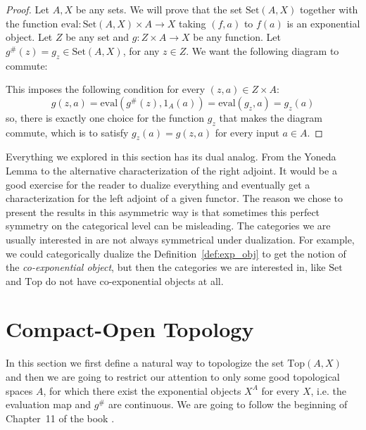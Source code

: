 \begin{proof} Let $A,X$ be any sets. We will prove that the set $\mathrm{Set}(A,X)$ together with the function $\mathrm{eval}:\mathrm{Set}(A,X)\times A\to X$ taking $(f,a)$ to $f(a)$ is an exponential object. Let $Z$ be any set and $g:Z\times A\to X$ be any function. Let $g^{\#}(z)=g_z\in\mathrm{Set}(A,X)$, for any $z\in Z$. We want the following diagram to commute:
\begin{center}
\end{center}
This imposes the following condition for every $(z,a)\in Z\times A$:
\[g(z,a)=\mathrm{eval}(g^{\#}(z),1_A(a))=\mathrm{eval}(g_z,a)=g_z(a)\]
so, there is exactly one choice for the function $g_z$ that makes the diagram commute, which is to satisfy $g_z(a)=g(z,a)$ for every input $a\in A$.
\end{proof}

Everything we explored in this section has its dual analog. From the Yoneda Lemma to the alternative characterization of the right adjoint. It would be a good exercise for the reader to dualize everything and eventually get a characterization for the left adjoint of a given functor. The reason we chose to present the results in this asymmetric way is that sometimes this perfect symmetry on the categorical level can be misleading. The categories we are usually interested in are not always symmetrical under dualization. For example, we could categorically dualize the Definition~\ref{def:exp_obj} to get the notion of the \emph{co-exponential object}, but then the categories we are interested in, like $\mathrm{Set}$ and $\mathrm{Top}$ do not have co-exponential objects at all.

\section{Compact-Open Topology}
In this section we first define a natural way to topologize the set $\mathrm{Top}(A,X)$ and then we are going to restrict our attention to only some good topological spaces $A$, for which there exist the exponential objects $X^A$ for every $X$, i.e. the evaluation map and $g^{\#}$ are continuous. We are going to follow the beginning of Chapter~11 of the book \cite{top_rotman}.

